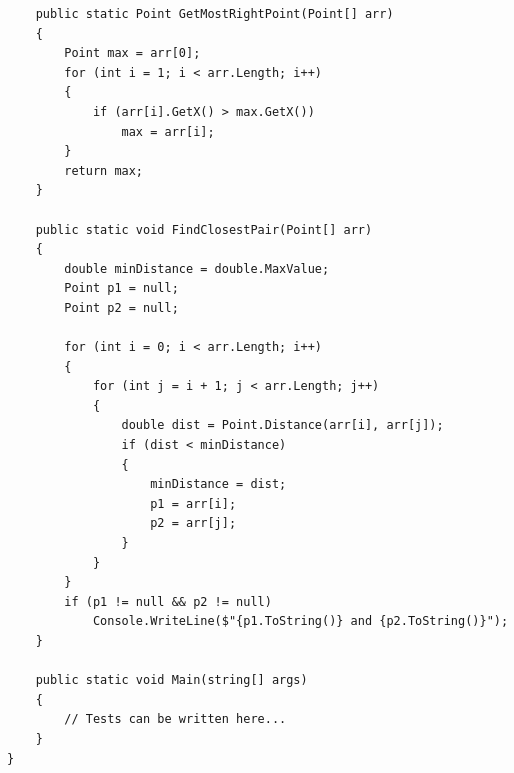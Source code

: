 \documentclass[14pt]{extarticle}
\begin{document}
{\begin{boxSolution}
\begin{english}
\begin{verbatim}
    public static Point GetMostRightPoint(Point[] arr)
    {
        Point max = arr[0];
        for (int i = 1; i < arr.Length; i++)
        {
            if (arr[i].GetX() > max.GetX())
                max = arr[i];
        }
        return max;
    }

    public static void FindClosestPair(Point[] arr)
    {
        double minDistance = double.MaxValue;
        Point p1 = null;
        Point p2 = null;

        for (int i = 0; i < arr.Length; i++)
        {
            for (int j = i + 1; j < arr.Length; j++)
            {
                double dist = Point.Distance(arr[i], arr[j]);
                if (dist < minDistance)
                {
                    minDistance = dist;
                    p1 = arr[i];
                    p2 = arr[j];
                }
            }
        }
        if (p1 != null && p2 != null)
            Console.WriteLine($"{p1.ToString()} and {p2.ToString()}");
    }

    public static void Main(string[] args)
    {
        // Tests can be written here...
    }
}
\end{verbatim}
\end{english}
\end{boxSolution}
}
\fi
\end{document}
